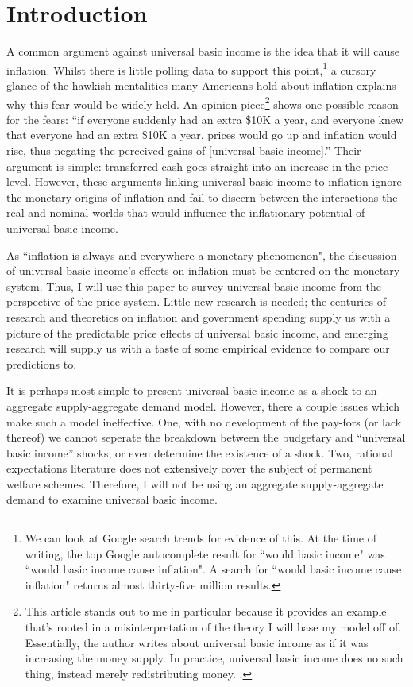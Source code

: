 \documentclass[paper=a4, fontsize=11pt,twoside]{scrartcl}
\begin{document}
\section{Introduction}
A common argument against universal basic income is the idea that it will cause inflation. Whilst there is little polling data to support this point,\footnote{We can look at Google search trends for evidence of this. At the time of writing, the top Google autocomplete result for ``would basic income" was ``would basic income cause inflation". A search for ``would basic income cause inflation" returns almost thirty-five million results.} a cursory glance of the hawkish mentalities many Americans hold about inflation\autocite{10.2307/1991488} explains why this fear would be widely held. An opinion piece\footnote{This article stands out to me in particular because it provides an example that's rooted in a misinterpretation of the theory I will base my model off of. Essentially, the author writes about universal basic income as if it was increasing the money supply. In practice, universal basic income does no such thing, instead merely redistributing money. \autocite{hill:antiubiarticle}.} shows one possible reason for the fears: ``if everyone suddenly had an extra \$10K a year, and everyone knew that everyone had an extra \$10K a year, prices would go up and inflation would rise, thus negating the perceived gains of [universal basic income].'' Their argument is simple: transferred cash goes straight into an increase in the price level. However, these arguments linking universal basic income to inflation ignore the monetary origins of inflation and fail to discern between the interactions the real and nominal worlds that would influence the inflationary potential of universal basic income.

As ``inflation is always and everywhere a monetary phenomenon"\autocite{friedman:counterrev}, the discussion of universal basic income's effects on inflation must be centered on the monetary system. Thus, I will use this paper to survey universal basic income from the perspective of the price system. Little new research is needed; the centuries of research and theoretics on inflation and government spending supply us with a picture of the predictable price effects of universal basic income, and emerging research will supply us with a taste of some empirical evidence to compare our predictions to. 

It is perhaps most simple to present universal basic income as a shock to an aggregate supply-aggregate demand model. However, there a couple issues which make such a model ineffective. One, with no development of the pay-fors (or lack thereof) we cannot seperate the breakdown between the budgetary and ``universal basic income'' shocks, or even determine the existence of a shock. Two, rational expectations literature does not extensively cover the subject of permanent welfare schemes. Therefore, I will not be using an aggregate supply-aggregate demand to examine universal basic income. 
\end{document}
